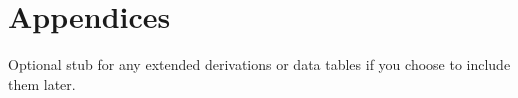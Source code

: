 \section{Appendices}

Optional stub for any extended derivations or data tables if you choose to include them later.
